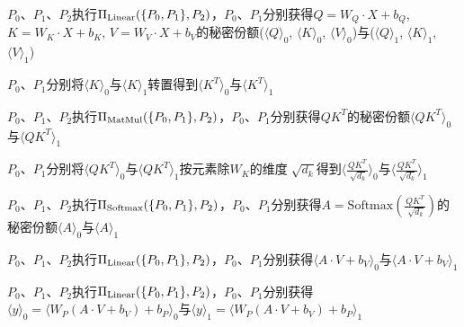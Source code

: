 \begin{algorithm}[H]
	\SetAlgoLined
	
	
	$P_0$、$P_1$、$P_2$执行$\Pi_{\rm Linear}(\{P_0, P_1\}, P_2)$，$P_0$、$P_1$分别获得$Q=W_Q\cdot X + b_Q$, $K=W_K\cdot X + b_K$, $V=W_V\cdot X + b_V$的秘密份额($\langle Q\rangle_0$, $\langle K\rangle_0$, $\langle V\rangle_0$)与($\langle Q\rangle_1$, $\langle K\rangle_1$, $\langle V\rangle_1$)
	
	$P_0$、$P_1$分别将$\langle K\rangle_0$与$\langle K\rangle_1$转置得到$\langle K^T\rangle_0$与$\langle K^T\rangle_1$
	
	$P_0$、$P_1$、$P_2$执行$\Pi_{\rm MatMul}(\{P_0, P_1\}, P_2)$，$P_0$、$P_1$分别获得$QK^T$的秘密份额$\langle QK^T\rangle_0$与$\langle QK^T\rangle_1$
	
	$P_0$、$P_1$分别将$\langle QK^T\rangle_0$与$\langle QK^T\rangle_1$按元素除$W_K$的维度$\sqrt[]{d_k}$得到$\langle\frac{ QK^T }{\sqrt[]{d_k}}\rangle_0$与$\langle\frac{ QK^T }{\sqrt[]{d_k}}\rangle_1$
	
	$P_0$、$P_1$、$P_2$执行$\Pi_{\rm Softmax}(\{P_0, P_1\}, P_2)$，$P_0$、$P_1$分别获得$A=\text{Softmax}(\frac{ QK^T }{\sqrt[]{d_k}})$的秘密份额$\langle A\rangle_0$与$\langle A\rangle_1$
	
	$P_0$、$P_1$、$P_2$执行$\Pi_{\rm Linear}(\{P_0, P_1\}, P_2)$，$P_0$、$P_1$分别获得$\langle A\cdot V + b_V\rangle_0$与$\langle A\cdot V + b_V\rangle_1$
	
	$P_0$、$P_1$、$P_2$执行$\Pi_{\rm Linear}(\{P_0, P_1\}, P_2)$，$P_0$、$P_1$分别获得$\langle y\rangle_0 = \langle W_P(A\cdot V + b_V) + b_P\rangle_0$与$\langle y\rangle_1 = \langle W_P(A\cdot V + b_V) + b_P\rangle_1$
	
	\caption{ $\Pi_{\rm Attention}(\{P_0, P_1\}, P_2)$ }
	\label{Attention}
\end{algorithm}

